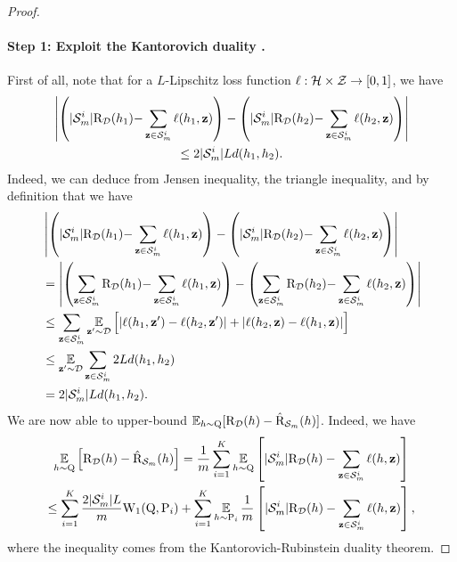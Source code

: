 \begin{noaddcontents}
\begin{proof}
    \paragraph{Step 1: Exploit the Kantorovich duality \cite[Remark 6.5]{villani2009optimal}.}
    First of all, note that for a $L$-Lipschitz loss function $\ell: \mathcal{H}\times\mathcal{Z}\to[0,1]$, we have
    \begin{multline}
    \left\vert\left( |\mathcal{S}_m^{i}|\text{R}_{\mathcal{D}}(h_1){-}\sum_{\mathbf{z}\in\mathcal{S}_m^{i}}\ell(h_1, \mathbf{z})\right) - \left( |\mathcal{S}_m^{i}|\text{R}_{\mathcal{D}}(h_2){-}\sum_{\mathbf{z}\in\mathcal{S}_m^{i}}\ell(h_2, \mathbf{z})\right)\right\vert \\\le 2|\mathcal{S}_m^{i}|Ld(h_1, h_2).\label{eq:proof-supervised-ht-1}
    \end{multline}
    Indeed, we can deduce  from Jensen inequality, the triangle inequality, and by definition that we have
    \begin{align*}
    &\left\vert\left( |\mathcal{S}_m^{i}|\text{R}_{\mathcal{D}}(h_1){-}\sum_{\mathbf{z}\in\mathcal{S}_m^{i}}\ell(h_1, \mathbf{z})\right) - \left( |\mathcal{S}_m^{i}|\text{R}_{\mathcal{D}}(h_2){-}\sum_{\mathbf{z}\in\mathcal{S}_m^{i}}\ell(h_2, \mathbf{z})\right)\right\vert\\
    &= \left\vert\left(\sum_{\mathbf{z}\in\mathcal{S}_m^{i}}\text{R}_{\mathcal{D}}(h_1){-}\sum_{\mathbf{z}\in\mathcal{S}_m^{i}}\ell(h_1, \mathbf{z})\right) - \left(\sum_{\mathbf{z}\in\mathcal{S}_m^{i}}\text{R}_{\mathcal{D}}(h_2){-}\sum_{\mathbf{z}\in\mathcal{S}_m^{i}}\ell(h_2, \mathbf{z})\right)\right\vert\\
    &\le \sum_{\mathbf{z}\in\mathcal{S}_m^{i}}\operatorname*{\mathbb{E}}_{\mathbf{z}'\sim\mathcal{D}}\Big[ |\ell(h_1, \mathbf{z}')-\ell(h_2, \mathbf{z}')|+|\ell(h_2, \mathbf{z})-\ell(h_1, \mathbf{z})|\Big]\\
    &\le \operatorname*{\mathbb{E}}_{\mathbf{z}'\sim\mathcal{D}}\sum_{\mathbf{z}\in\mathcal{S}_m^{i}} 2Ld(h_1, h_2)\\
    &= 2|\mathcal{S}_m^{i}|Ld(h_1, h_2).
    \end{align*}
    We are now able to upper-bound $\operatorname*{\mathbb{E}}_{h\sim\mathrm{Q}}[ \text{R}_{\mathcal{D}}(h) - \hat{\text{R}}_{\mathcal{S}_m}(h) ]$. 
    Indeed, we have
    \begin{multline}
    \operatorname*{\mathbb{E}}_{h\sim\mathrm{Q}}\Big[ \text{R}_{\mathcal{D}}(h) - \hat{\text{R}}_{\mathcal{S}_m}(h) \Big] = \frac{1}{m}\sum_{i=1}^{K} \operatorname*{\mathbb{E}}_{h\sim\mathrm{Q}}\left[ |\mathcal{S}_m^{i}|\text{R}_{\mathcal{D}}(h) - \sum_{\mathbf{z}\in\mathcal{S}_m^{i}}\ell(h, \mathbf{z}) \right]\\
    \le \sum_{i=1}^{K} \frac{2|\mathcal{S}_m^{i}|L}{m}\mathrm{W}_{1}(\mathrm{Q}, \mathrm{P}_i) + \sum_{i=1}^{K} \operatorname*{\mathbb{E}}_{h\sim\mathrm{P}_i} \frac{1}{m}\left[ |\mathcal{S}_m^{i}|\text{R}_{\mathcal{D}}(h) - \sum_{\mathbf{z}\in\mathcal{S}_m^{i}} \ell(h, \mathbf{z}) \right],\label{eq:proof-supervised-ht-2}
    \end{multline}
    where the inequality comes from the Kantorovich-Rubinstein duality theorem.
    

\end{proof}
\end{noaddcontents}
